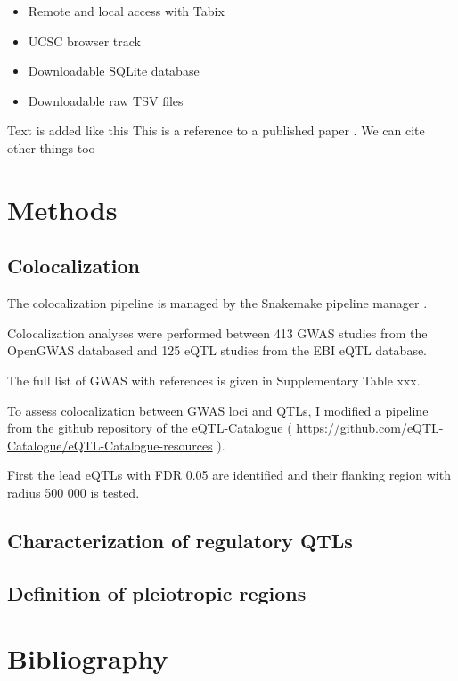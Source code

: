 \begin{itemize}
  \item Remote and local access with Tabix
  \item UCSC browser track
  \item Downloadable SQLite database
  \item Downloadable raw TSV files
\end{itemize}

Text is added like this
This is a reference to a published paper \citep{2019.Watanabe}.
We can cite other things too \citep{watson_molecular_1953}

\section*{Methods}\label{s:methods}

\subsection*{Colocalization}

The colocalization pipeline is managed by the Snakemake pipeline manager \citep{2021.Koester.Moelder}.

Colocalization analyses were performed between 413 GWAS studies from the OpenGWAS databased and 125 eQTL studies from the EBI eQTL database.

The full list of GWAS with references is given in Supplementary Table xxx.

To assess colocalization between GWAS loci and QTLs, I modified a pipeline from the github repository of the eQTL-Catalogue ( \url{https://github.com/eQTL-Catalogue/eQTL-Catalogue-resources} ).

First the lead eQTLs with FDR 0.05 are identified and their flanking region with radius 500 000 is tested.

\subsection*{Characterization of regulatory QTLs}


\subsection*{Definition of pleiotropic regions}



\section*{Bibliography}





